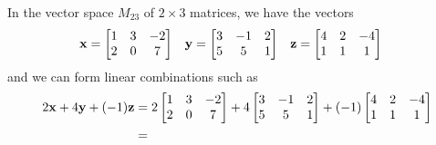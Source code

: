 \documentclass{ximera}
\begin{document}
\begin{example}
  In the vector space $M_{23}$ of $2\times 3$ matrices, we have the vectors
  \begin{align*}
    \mathbf{x}&=
              \begin{bmatrix}
                1&3&-2\\
                2&0&7
              \end{bmatrix}
                   &
                     \mathbf{y}&=
                               \begin{bmatrix}
                                 3&-1&2\\
                                 5&5&1
                               \end{bmatrix}
                   &
                     \mathbf{z}&=
                               \begin{bmatrix}
                                 4&2&-4\\
                                 1&1&1
                               \end{bmatrix}
  \end{align*}
  and we can form linear combinations such as
  \begin{align*}
    2\vect{x}+4\vect{y}+(-1)\vect{z}&=
                                      2
                                      \begin{bmatrix}
                                        1&3&-2\\
                                        2&0&7
                                      \end{bmatrix}
                                             +4
                                             \begin{bmatrix}
                                               3&-1&2\\
                                               5&5&1
                                             \end{bmatrix}
                                                    +(-1)
                                                    \begin{bmatrix}
                                                      4&2&-4\\
                                                      1&1&1
                                                    \end{bmatrix}\\
                                    &=

\end{align*}
\end{example}
\end{document}
